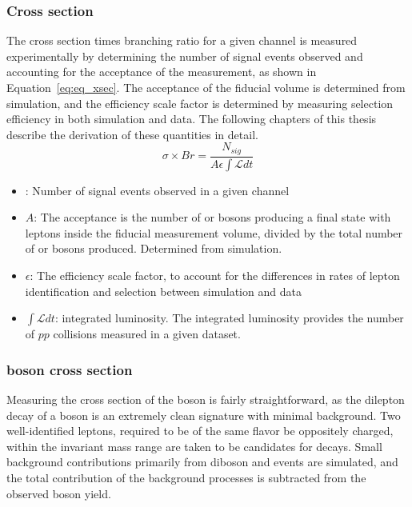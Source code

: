 \subsubsection{Cross section}
The cross section times branching ratio for a given channel is measured experimentally by determining the number of signal events observed and accounting for the acceptance of the measurement, as shown in Equation~\ref{eq:eq_xsec}. The acceptance of the fiducial volume is determined from simulation, and the efficiency scale factor is determined by measuring selection efficiency in both simulation and data. The following chapters of this thesis describe the derivation of these quantities in detail.
\begin{equation}\label{eq:eq_xsec}
\sigma\times Br = \frac{N_{sig}}{A\epsilon \int\mathcal{L} dt}
\end{equation}
\begin{itemize}
\item \nsig: Number of signal events observed in a given channel
\item $A$: The acceptance is the number of \W or \Z bosons producing a final state with leptons inside the fiducial measurement volume, divided by the total number of \W or \Z bosons produced. Determined from simulation. 
\item $\epsilon$: The efficiency scale factor, to account for the differences in rates of lepton identification and selection between simulation and data
\item $\int\mathcal{L}dt$: integrated luminosity. The integrated luminosity provides the number of $pp$ collisions measured in a given dataset.
\end{itemize}

\subsubsection{\Z boson cross section}
Measuring the cross section of the \Z boson is fairly straightforward, as the dilepton decay of a \Z boson is an extremely clean signature with minimal background. Two well-identified leptons, required to be of the same flavor be oppositely charged, within the invariant mass range \masswindow are taken to be candidates for \zll decays. Small background contributions primarily from diboson and \ttbar events are simulated, and the total contribution of the background processes is subtracted from the observed \Z boson yield. 

